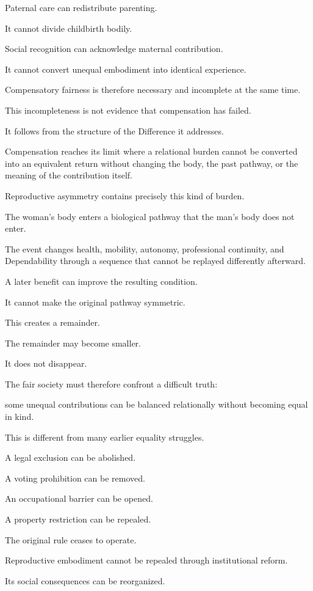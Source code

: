 Paternal care can redistribute parenting.

It cannot divide childbirth bodily.

Social recognition can acknowledge maternal contribution.

It cannot convert unequal embodiment into identical experience.

Compensatory fairness is therefore necessary and incomplete at the same time.

This incompleteness is not evidence that compensation has failed.

It follows from the structure of the Difference it addresses.

Compensation reaches its limit where a relational burden cannot be converted into an equivalent return without changing the body, the past pathway, or the meaning of the contribution itself.

Reproductive asymmetry contains precisely this kind of burden.

The woman’s body enters a biological pathway that the man’s body does not enter.

The event changes health, mobility, autonomy, professional continuity, and Dependability through a sequence that cannot be replayed differently afterward.

A later benefit can improve the resulting condition.

It cannot make the original pathway symmetric.

This creates a remainder.

The remainder may become smaller.

It does not disappear.

The fair society must therefore confront a difficult truth:

some unequal contributions can be balanced relationally without becoming equal in kind.

This is different from many earlier equality struggles.

A legal exclusion can be abolished.

A voting prohibition can be removed.

An occupational barrier can be opened.

A property restriction can be repealed.

The original rule ceases to operate.

Reproductive embodiment cannot be repealed through institutional reform.

Its social consequences can be reorganized.

